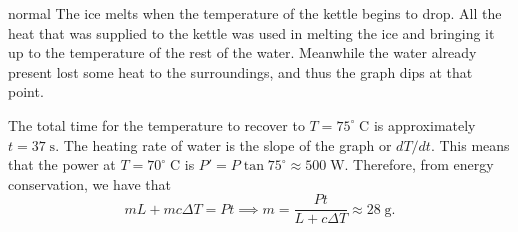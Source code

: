 \begin{solution}{normal}
The ice melts when the temperature of the kettle begins to drop. All the heat that was supplied to the kettle was used in melting the ice and bringing it up to the temperature of the rest of the water. Meanwhile the water already present lost some heat to the surroundings, and thus the graph dips at that point.
\vspace{3mm}

The total time for the temperature to recover to $T = 75^{\circ}\;\mathrm{C}$ is approximately $t = 37\;\mathrm{s}$. The heating rate of water is the slope of the graph or $dT/dt$. This means that the power at $T = 70^{\circ}\;\mathrm{C}$ is $P' = P \tan 75^{\circ}\approx 500\;\mathrm{W}$. Therefore, from energy conservation, we have that 
\[mL + mc\Delta T = Pt\implies m = \frac{Pt}{L + c\Delta T} \approx \boxed{28\;\mathrm{g}}.\]
\end{solution}